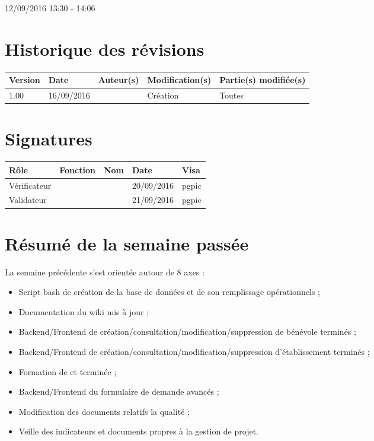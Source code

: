\documentclass [a4paper] {article}
\begin{document}
12/09/2016			 				%
\hfill   
\hfill 	 13:30 - 14:06				%


\section*{Historique des révisions}
\begin{center}
			\begin{tabular}{| p{2.5cm} | p{3cm} | p{3cm} | p{3cm} | p{3.5cm} |}
				\hline
				\rowcolor{Gray}
				Version & Date & Auteur(s) & Modification(s) & Partie(s) modifiée(s)		 \\
				\hline
				1.00 & 16/09/2016 & \Kafui & Création & Toutes \\
				\hline			
			\end{tabular}
		\end{center}

\section*{Signatures}

		\begin{center}
			\begin{tabular}{| p{2.5cm} | p{4cm} | p{3cm} | p{3cm} | p{2.5cm} |}
				\hline
				\rowcolor{Gray}
				Rôle & Fonction & Nom & Date & Visa		 \\
				\hline
				Vérificateur & \RGC & \Melissa & 20/09/2016 & pgpic \\[30pt]
				\hline
				Validateur & \CP & \Pierre &  21/09/2016 & pgpic \\[30pt]	
				\hline
			\end{tabular}
		\end{center}

\section{Résumé de la semaine passée}
La semaine précédente s'est orientée autour de 8 axes :  
\begin{itemize}
\item Script bash de création de la base de données et de son remplissage opérationnels ;
\item Documentation du wiki mis à jour ;
\item Backend/Frontend de création/consultation/modification/suppression de bénévole terminés ;
\item Backend/Frontend de création/consultation/modification/suppression d'établissement terminés ;
\item Formation de \Juliana{} et \Francois{} terminée ;
\item Backend/Frontend du formulaire de demande avancés ;
\item Modification des documents relatifs la qualité ;
\item Veille des indicateurs et documents propres à la gestion de projet.
\end{itemize} 
\end{document}
